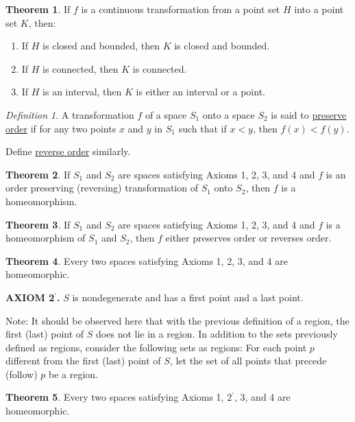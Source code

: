 \documentclass[12pt, oneside, letter] {amsart}
\theoremstyle {definition}
\newtheorem {thm} {Theorem}
\theoremstyle {remark}
\newtheorem* {defn} {Definition}
\begin{document}
\begin{thm}
  If $f$ is a continuous transformation from a point set $H$ into a
  point set $K$, then:

  \begin{enumerate}
  \item If $H$ is closed and bounded, then $K$ is closed and bounded.
  \item If $H$ is connected, then $K$ is connected.
  \item If $H$ is an interval, then $K$ is either an interval or a
    point.
  \end{enumerate}
\end{thm}

\begin{defn}
  A transformation $f$ of a space $S_1$ onto a space $S_2$ is said to
  \underline {preserve order} if for any two points $x$ and $y$ in
  $S_1$ such that if $x < y$, then $f(x) < f(y)$.
  
  Define \underline{reverse order} similarly.
\end{defn}

\begin{thm}
  If $S_1$ and $S_2$ are spaces satisfying Axioms 1, 2, 3, and 4 and
  $f$ is an order preserving (reversing) transformation of $S_1$ onto
  $S_2$, then $f$ is a homeomorphism.
\end{thm}

\begin{thm}
  If $S_1$ and $S_2$ are spaces satisfying Axioms 1, 2, 3, and 4 and
  $f$ is a homeomorphism of $S_1$ and $S_2$, then $f$ either preserves
  order or reverses order.
\end{thm}

\begin{thm}
  Every two spaces satisfying Axioms 1, 2, 3, and 4 are homeomorphic.
\end{thm}

\noindent \textbf {AXIOM 2$^\prime$.} $S$ is nondegenerate and has a first
 point and a last point.

Note: It should be observed here that with the previous definition of
a region, the first (last) point of $S$ does not lie in a region. In
addition to the sets previously defined as regions, consider the
following sets as regions: For each point $p$ different from the first
(last) point of $S$, let the set of all points that precede (follow)
$p$ be a region.

\begin{thm}
  Every two spaces satisfying Axioms 1, 2$^\prime$, 3, and 4 are
  homeomorphic.
\end{thm}
\end{document}
